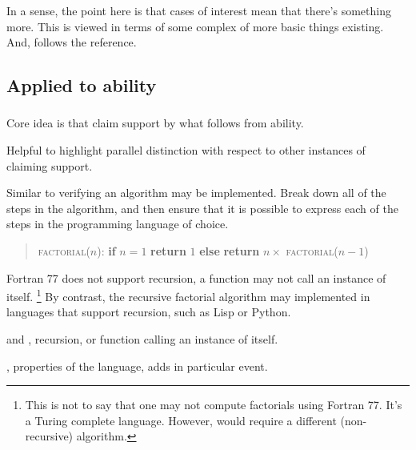 \begin{note}[Existentials]
  In a sense, the point here is that \adA{} cases of interest mean that there's something more.
  This is viewed in terms of some complex of more basic things existing.
  And, \adB{} follows the reference.
\end{note}

\subsection{Applied to ability}
\label{sec:applied-ability}

\subsubsection{\adA{}}
\label{sec:ads}

\subsubsection{\adB{}}
\label{sec:adc}

\begin{note}
  Core idea is that claim support by what follows from ability.

  Helpful to highlight parallel distinction with respect to other instances of claiming support.
\end{note}

\begin{note}
  Similar to verifying an algorithm may be implemented.
  Break down all of the steps in the algorithm, and then ensure that it is possible to express each of the steps in the programming language of choice.

  \begin{quote}
    \textsc{factorial}(\(n\)):\newline
    \textbf{if} \(n = 1\)\newline
    \mbox{}\indent \textbf{return} \(1\)\newline
    \textbf{else}\newline
    \mbox{}\indent \textbf{return} \(n \times\) \textsc{factorial}(\(n-1\))
  \end{quote}

  Fortran 77 does not support recursion, a function may not call an instance of itself.\nolinebreak
  \footnote{
    This is not to say that one may not compute factorials using Fortran 77.
    It's a Turing complete language.
    However, would require a different (non-recursive) algorithm.
  }
  By contrast, the recursive factorial algorithm may implemented in languages that support recursion, such as Lisp or Python.

  \adA{} and \adB{}, recursion, or function calling an instance of itself.

  \AR{}, properties of the language, \WR{} adds in particular event.
\end{note}

